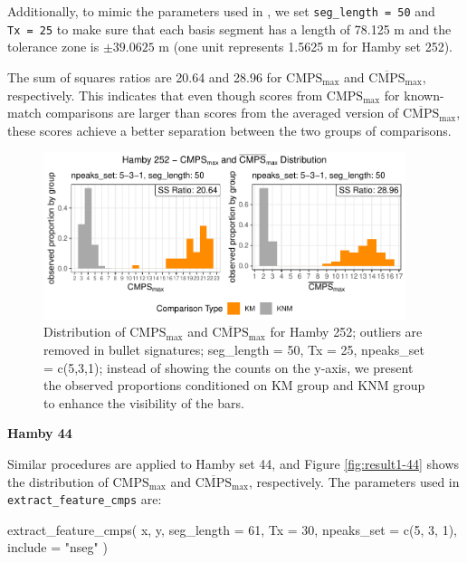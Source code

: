 Additionally, to mimic the parameters used in \citet{cmps}, we set
\texttt{seg\_length\ =\ 50} and \texttt{Tx\ =\ 25} to make sure that
each basis segment has a length of 78.125 \textmu m and the tolerance
zone is \(\pm 39.0625\) \textmu m (one unit represents 1.5625 \textmu m
for Hamby set 252).

The sum of squares ratios are 20.64 and 28.96 for
\(\mathrm{CMPS_{max}}\) and \(\mathrm{\overline{CMPS}_{max}}\),
respectively. This indicates that even though scores from
\(\mathrm{CMPS_{max}}\) for known-match comparisons are larger than
scores from the averaged version of \(\mathrm{\overline{CMPS}_{max}}\),
these scores achieve a better separation between the two groups of
comparisons.

\begin{Schunk}
\begin{figure}

{\centering \includegraphics[width=400px]{ju-hofmann_files/figure-latex/result1-252-1} 

}

\caption[Distribution of $\mathrm{CMPS_{max}}$ and $\mathrm{\overline{CMPS}_{max}}$ for Hamby 252]{Distribution of $\mathrm{CMPS_{max}}$ and $\mathrm{\overline{CMPS}_{max}}$ for Hamby 252; outliers are removed in bullet signatures; seg\_length = 50, Tx = 25, npeaks\_set = c(5,3,1); instead of showing the counts on the y-axis, we present the observed proportions conditioned on KM group and KNM group to enhance the visibility of the bars. }\label{fig:result1-252}
\end{figure}
\end{Schunk}

\textbf{Hamby 44}

Similar procedures are applied to Hamby set 44, and Figure
\ref{fig:result1-44} shows the distribution of \(\mathrm{CMPS_{max}}\)
and \(\mathrm{\overline{CMPS}_{max}}\), respectively. The parameters
used in \texttt{extract\_feature\_cmps} are:

\begin{Schunk}
\begin{Sinput}
extract_feature_cmps(
  x, y,
  seg_length = 61,
  Tx = 30,
  npeaks_set = c(5, 3, 1),
  include = "nseg"
)
\end{Sinput}
\end{Schunk}

